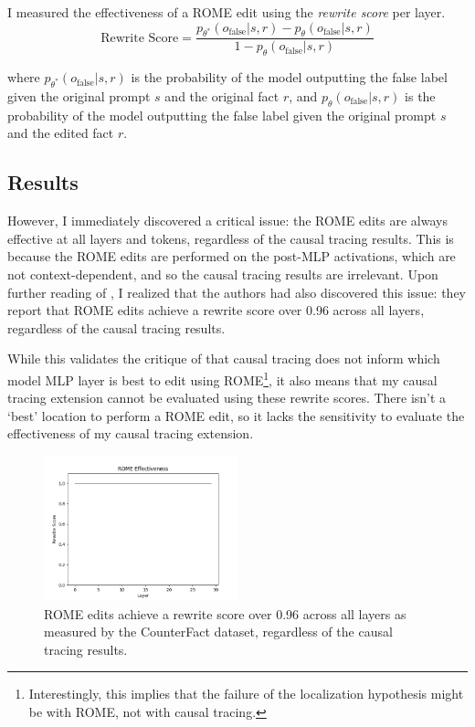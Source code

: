 \documentclass{article}
\begin{document}
I measured the effectiveness of a ROME edit using the \emph{rewrite score} \cite{hase2023does} per layer.
\[
\text{Rewrite Score} = \frac{p_{\theta^*}(o_{\text{false}} | s, r) - p_{\theta}(o_{\text{false}} | s, r)}{1 - p_{\theta}(o_{\text{false}} | s, r)}
\]
  
where $p_{\theta^*}(o_{\text{false}} | s, r)$ is the probability of the model outputting the false label given the original prompt $s$ and the original fact $r$, and $p_{\theta}(o_{\text{false}} | s, r)$ is the probability of the model outputting the false label given the original prompt $s$ and the edited fact $r$.

\subsection{Results}

However, I immediately discovered a critical issue: the ROME edits are always effective at all layers and tokens, regardless of the causal tracing results. This is because the ROME edits are performed on the post-MLP activations, which are not context-dependent, and so the causal tracing results are irrelevant. Upon further reading of \cite{hase2023does}, I realized that the authors had also discovered this issue: they report that ROME edits achieve a rewrite score over 0.96 across all layers, regardless of the causal tracing results. 

While this validates the critique of \cite{hase2023does} that causal tracing does not inform which model MLP layer is best to edit using ROME\footnote{Interestingly, this implies that the failure of the localization hypothesis might be with ROME, not with causal tracing.}, it also means that my causal tracing extension cannot be evaluated using these rewrite scores. There isn't a `best' location to perform a ROME edit, so it lacks the sensitivity to evaluate the effectiveness of my causal tracing extension. 

\begin{figure}[h]
  \centering
  \includegraphics[width=0.5\textwidth]{figures/ROME_rewrite.png}
  \caption{ROME edits achieve a rewrite score over 0.96 across all layers as measured by the CounterFact dataset, regardless of the causal tracing results. \cite{hase2023does}}
  \label{fig:rome_rewrites}
\end{figure}
\end{document}
